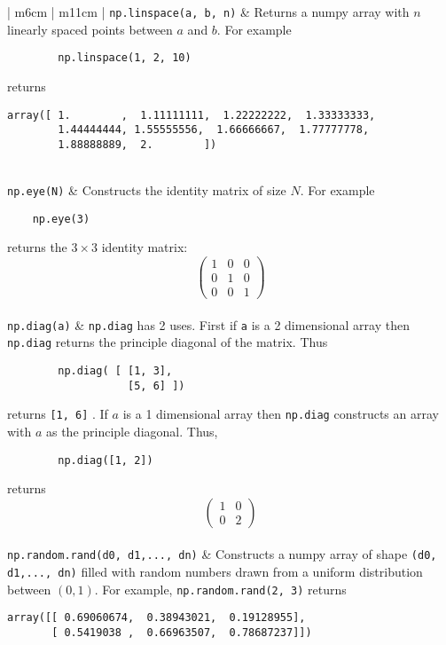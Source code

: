 \documentclass[]{article}
\begin{document}
\begin{longtable}{ | m{6cm}  | m{11cm} |}
	\texttt{np.linspace(a, b, n)} & Returns a numpy array with $n$ linearly spaced points between $a$ and $b$.  For example
	\begin{verbatim}
		np.linspace(1, 2, 10) 
	\end{verbatim}
    returns
	\begin{verbatim}
array([ 1.        ,  1.11111111,  1.22222222,  1.33333333, 
        1.44444444, 1.55555556,  1.66666667,  1.77777778, 
        1.88888889,  2.        ])
	\end{verbatim}
	\\\hline
	\texttt{np.eye(N)} & Constructs the identity matrix of size $N$.  For example  
	\begin{verbatim}
    np.eye(3)
	\end{verbatim}
    returns the $3\times 3$ identity matrix:
	\[
		\left(\begin{matrix}1&0&0\\0&1&0\\ 0&0&1\end{matrix}\right)
	\]\\\hline
	\texttt{np.diag(a)} & {\texttt{np.diag} } has 2 uses.  First if {\texttt{a}} is a 2 dimensional array then \texttt{np.diag} returns the principle diagonal of the matrix.  Thus
	\begin{verbatim}
        np.diag( [ [1, 3], 
                   [5, 6] ])
	\end{verbatim} 
    returns {\texttt{[1, 6]} }.  If $a$ is a 1 dimensional array then {\texttt{np.diag} } constructs an array with $a$ as the principle diagonal.  Thus, 
	\begin{verbatim}
        np.diag([1, 2])
	\end{verbatim}
    returns
	\[
		\left(\begin{matrix}1&0\\0&2\end{matrix}\right)
	\]\\\hline
	\texttt{np.random.rand(d0, d1,..., dn)} & Constructs a numpy array of shape {\texttt{(d0, d1,..., dn)} } filled with random numbers drawn from a uniform distribution between $(0, 1)$.  For example, {\texttt{np.random.rand(2, 3)} } returns
	\begin{verbatim}
array([[ 0.69060674,  0.38943021,  0.19128955], 
       [ 0.5419038 ,  0.66963507,  0.78687237]])
	\end{verbatim}

\end{longtable}
\end{document}
